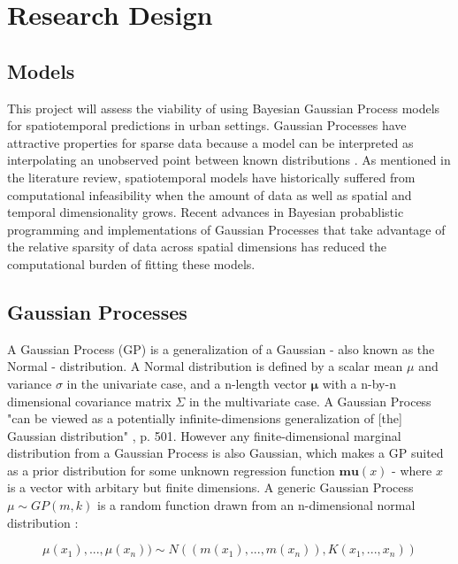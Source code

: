 
\section{Research Design}
\label{design}


\subsection{Models}

This project will assess the viability of using Bayesian Gaussian Process models for spatiotemporal predictions in urban settings. Gaussian Processes have attractive properties for sparse data because a model can be interpreted as interpolating an unobserved point between known distributions . As mentioned in the literature review, spatiotemporal models have historically suffered from computational infeasibility when the amount of data as well as spatial and temporal dimensionality grows. Recent advances in Bayesian probablistic programming and implementations of Gaussian Processes that take advantage of the relative sparsity of data across spatial dimensions has reduced the computational burden of fitting these models. \par


\subsection{Gaussian Processes}

A Gaussian Process (GP) is a generalization of a Gaussian - also known as the Normal - distribution. A Normal distribution is defined by a scalar mean $\mu$ and variance $\sigma$ in the univariate case, and a n-length vector $\mathbf{\mu}$ with a n-by-n dimensional covariance matrix $\Sigma$ in the multivariate case. A Gaussian Process "can be viewed as a potentially infinite-dimensions generalization of [the] Gaussian distribution" \cite{gelman2013bayesian} , p. 501. However any finite-dimensional marginal distribution from a Gaussian Process is also Gaussian, which makes a GP suited as a prior distribution for some unknown regression function $\mathbf{mu}(x)$ - where $x$ is a vector with arbitary but finite dimensions. A generic Gaussian Process $\mu \sim GP(m,k)$ is a random function drawn from an n-dimensional normal distribution \cite{gelman2013bayesian}: \par

$$ \mu(x_1),...,\mu(x_n)) \sim N((m(x_1),...,m(x_n)),K(x_1,...,x_n)) $$

